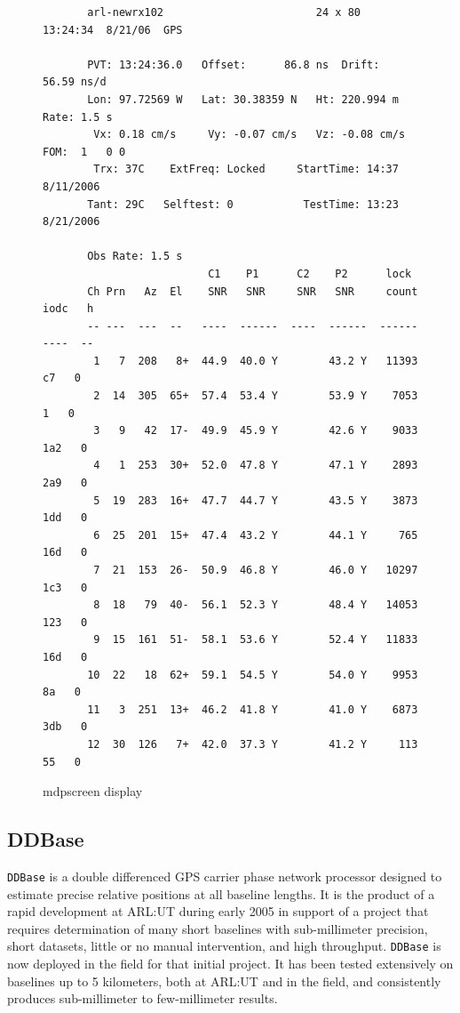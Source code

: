\documentclass{ion-gps}
\newcommand{\gpstkapplication}[1]{\texttt{#1}}
\begin{document}
\begin{figure}[htbp]
\begin{small}
\begin{bf}
\begin{lstlisting}
       arl-newrx102                        24 x 80               13:24:34  8/21/06  GPS

       PVT: 13:24:36.0   Offset:      86.8 ns  Drift:     56.59 ns/d
       Lon: 97.72569 W   Lat: 30.38359 N   Ht: 220.994 m    Rate: 1.5 s
        Vx: 0.18 cm/s     Vy: -0.07 cm/s   Vz: -0.08 cm/s   FOM:  1   0 0 
        Trx: 37C    ExtFreq: Locked     StartTime: 14:37 8/11/2006
       Tant: 29C   Selftest: 0           TestTime: 13:23 8/21/2006

       Obs Rate: 1.5 s
                          C1    P1      C2    P2      lock
       Ch Prn   Az  El    SNR   SNR     SNR   SNR     count  iodc   h
       -- ---  ---  --   ----  ------  ----  ------  ------  ----  --
        1   7  208   8+  44.9  40.0 Y        43.2 Y   11393    c7   0
        2  14  305  65+  57.4  53.4 Y        53.9 Y    7053     1   0
        3   9   42  17-  49.9  45.9 Y        42.6 Y    9033   1a2   0
        4   1  253  30+  52.0  47.8 Y        47.1 Y    2893   2a9   0
        5  19  283  16+  47.7  44.7 Y        43.5 Y    3873   1dd   0
        6  25  201  15+  47.4  43.2 Y        44.1 Y     765   16d   0
        7  21  153  26-  50.9  46.8 Y        46.0 Y   10297   1c3   0
        8  18   79  40-  56.1  52.3 Y        48.4 Y   14053   123   0
        9  15  161  51-  58.1  53.6 Y        52.4 Y   11833   16d   0
       10  22   18  62+  59.1  54.5 Y        54.0 Y    9953    8a   0
       11   3  251  13+  46.2  41.8 Y        41.0 Y    6873   3db   0
       12  30  126   7+  42.0  37.3 Y        41.2 Y     113    55   0
\end{lstlisting}
\end{bf}
\end{small}
\caption{mdpscreen display}
\label{fig:mdpscreendump}
\end{figure}


\subsection*{DDBase}

\gpstkapplication{DDBase} is a double differenced GPS carrier phase
network processor designed to estimate precise relative positions at
all baseline lengths. It is the product of a rapid development at
ARL:UT during early 2005 in support of a project that requires
determination of many short baselines with sub-millimeter precision,
short datasets, little or no manual intervention, and high
throughput. \gpstkapplication{DDBase} is now deployed in the field for
that initial project\cite{ion:gstss06}. It has been tested extensively
on baselines up to 5 kilometers, both at ARL:UT and in the field, and
consistently produces sub-millimeter to few-millimeter results.
\end{document}
